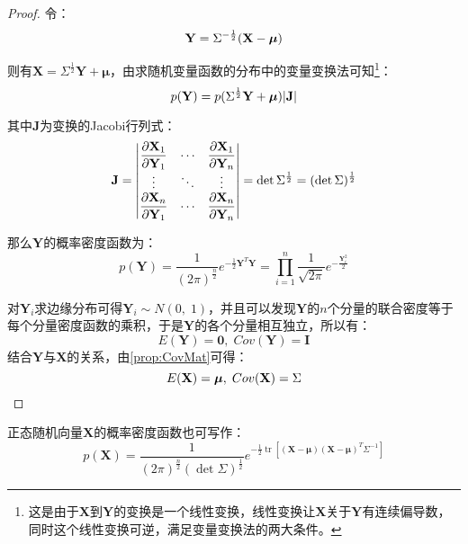 \begin{proof}
	令：
	\begin{equation}
		\mathbf{Y}=\Sigma^{-\frac{1}{2}}(\mathbf{X}-\boldsymbol{\mu})\notag
	\end{equation}\par
	则有$\mathbf{X}=\Sigma^{\frac{1}{2}}\mathbf{Y}+\boldsymbol{\mu}$，由求随机变量函数的分布中的变量变换法可知\footnote{这是由于$\mathbf{X}$到$\mathbf{Y}$的变换是一个线性变换，线性变换让$\mathbf{X}$关于$\mathbf{Y}$有连续偏导数，同时这个线性变换可逆，满足变量变换法的两大条件。}：
	\begin{equation}
		p(\mathbf{Y})=p(\Sigma^{\frac{1}{2}}\mathbf{Y}+\boldsymbol{\mu})|\mathbf{J}|\notag
	\end{equation}\par
	其中$\mathbf{J}$为变换的Jacobi行列式：
	\begin{equation}
		\mathbf{J}=
		\begin{vmatrix}
			\dfrac{\partial \mathbf{X}_1}{\partial \mathbf{Y}_1} & \cdots & \dfrac{\partial \mathbf{X}_1}{\partial \mathbf{Y}_n} \\
			\vdots & \ddots & \vdots \\
			\dfrac{\partial \mathbf{X}_n}{\partial \mathbf{Y}_1} & \cdots & \dfrac{\partial \mathbf{X}_n}{\partial \mathbf{Y}_n}
		\end{vmatrix}
		=\det\Sigma^{\frac{1}{2}}=(\det\Sigma)^{\frac{1}{2}}\notag
	\end{equation}\par
	那么$\mathbf{Y}$的概率密度函数为：
	\begin{equation*}
		p(\mathbf{Y})
		=\frac{1}{(2\pi)^{\frac{n}{2}}}e^{-\frac{1}{2}               \mathbf{Y}^T\mathbf{Y}}
		=\prod_{i=1}^n\frac{1}{\sqrt{2\pi}}e^{-\frac{\mathbf{Y}_i^2}{2}}
	\end{equation*}\par
	对$\mathbf{Y}_i$求边缘分布可得$\mathbf{Y}_i\sim N(0,\;1)$，并且可以发现$\mathbf{Y}$的$n$个分量的联合密度等于每个分量密度函数的乘积，于是$\mathbf{Y}$的各个分量相互独立，所以有：
	\begin{equation*}
		E(\mathbf{Y})=\mathbf{0},\;Cov(\mathbf{Y})=\mathbf{I}
	\end{equation*}
	结合$\mathbf{Y}$与$\mathbf{X}$的关系，由\cref{prop:CovMat}可得：
	\begin{equation*}
		E(\mathbf{X})=\boldsymbol{\mu},\;Cov(\mathbf{X})=\Sigma \qedhere
	\end{equation*}
\end{proof}
\begin{definition}\label{def:MultiNormalPDF2}
	正态随机向量$\mathbf{X}$的概率密度函数也可写作：
	\begin{equation*}
		p(\mathbf{X})=\frac{1}{(2\pi)^{\frac{n}{2}}(\det\Sigma)^{\frac{1}{2}}}e^{-\frac{1}{2}\operatorname{tr}[(\mathbf{X}-\boldsymbol{\mu})(\mathbf{X}-\boldsymbol{\mu})^T\Sigma^{-1}]}
	\end{equation*} 
\end{definition}
